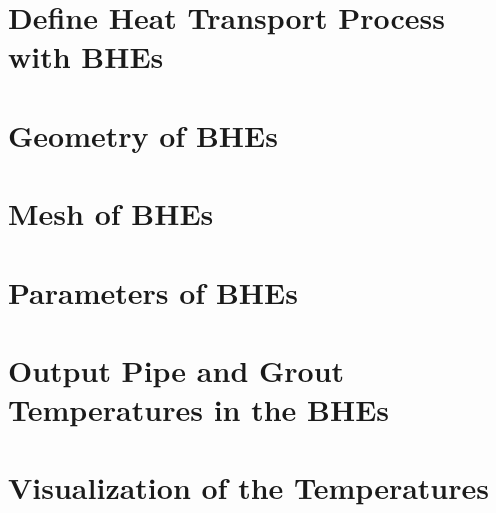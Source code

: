 \section{Define Heat Transport Process with BHEs}

\section{Geometry of BHEs}

\section{Mesh of BHEs}

\section{Parameters of BHEs}

\section{Output Pipe and Grout Temperatures in the BHEs}

\section{Visualization of the Temperatures}


